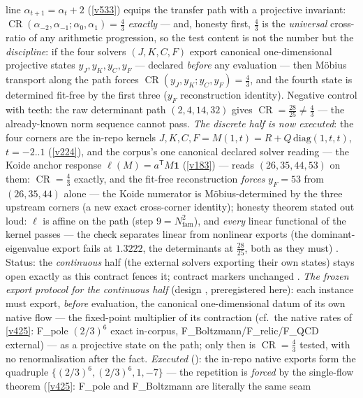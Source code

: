 \documentclass[11pt,a4paper]{article}
\newcommand{\Nfam}{N_{\mathrm{fam}}}
\begin{document}
line $\alpha_{t+1}=\alpha_t+2$ (\vref{v533}) equips the transfer path with a projective invariant:
$\operatorname{CR}(\alpha_{-2},\alpha_{-1};\alpha_0,\alpha_1)=\tfrac43$ \emph{exactly} --- and,
honesty first, $\tfrac43$ is the \emph{universal} cross-ratio of any arithmetic progression, so the
test content is not the number but the \emph{discipline}: if the four solvers $(J,K,C,F)$ export
canonical one-dimensional projective states $y_J,y_K,y_C,y_F$ --- declared \emph{before} any
evaluation --- then M\"obius transport along the path forces
$\operatorname{CR}(y_J,y_K;y_C,y_F)=\tfrac43$, and the fourth state is determined fit-free by the
first three ($y_F$ reconstruction identity).  Negative control with teeth: the raw determinant path
$(2,4,14,32)$ gives $\operatorname{CR}=\tfrac{28}{25}\neq\tfrac43$ --- the already-known norm
sequence cannot pass.  \emph{The discrete half is now executed}: the four corners are the in-repo
kernels $J,K,C,F=M(1,t)=R+Q\,\mathrm{diag}(1,t,t)$, $t=-2..1$ (\vref{v224}), and the corpus's one
canonical declared solver reading --- the Koide anchor response $\ell(M)=a^{\mathsf T}M\mathbf 1$
(\vref{v183}) --- reads $(26,35,44,53)$ on them: $\operatorname{CR}=\tfrac43$ exactly, and the
fit-free reconstruction \emph{forces} $y_F=53$ from $(26,35,44)$ alone --- the Koide numerator is
M\"obius-determined by the three upstream corners (a new exact cross-corner identity); honesty
theorem stated out loud: $\ell$ is affine on the path (step $9=\Nfam^2$), and \emph{every} linear
functional of the kernel passes --- the check separates linear from nonlinear exports (the
dominant-eigenvalue export fails at $1.3222$, the determinants at $\tfrac{28}{25}$, both as they
must) \mE.  Status: the \emph{continuous} half (the external solvers exporting their own states)
stays open exactly as this contract fences it; contract markers unchanged \mC.  \emph{The frozen
export protocol for the continuous half} (design \mX, preregistered here): each instance must
export, \emph{before} evaluation, the canonical one-dimensional datum of its own native flow ---
the fixed-point multiplier of its contraction (cf.\ the native rates of \vref{v425}: F\_pole
$(2/3)^6$ exact in-corpus, F\_Boltzmann/F\_relic/F\_QCD external) --- as a projective state on
the path; only then is $\operatorname{CR}=\tfrac43$ tested, with no renormalisation after the
fact.  \emph{Executed} (): the in-repo native exports
form the quadruple $\{(2/3)^6,(2/3)^6,1,-7\}$ --- the repetition is \emph{forced} by the
single-flow theorem (\vref{v425}: F\_pole and F\_Boltzmann are literally the same seam
\end{document}
